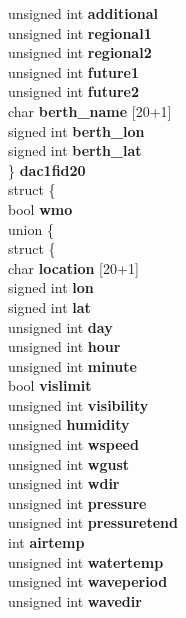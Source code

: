 \begin{DoxyCompactItemize}
{\begin{tabbing}
{\>\>\>\>unsigned int {\bfseries additional}\\
\>\>\>\>unsigned int {\bfseries regional1}\\
\>\>\>\>unsigned int {\bfseries regional2}\\
\>\>\>\>unsigned int {\bfseries future1}\\
\>\>\>\>unsigned int {\bfseries future2}\\
\>\>\>\>char {\bfseries berth\_name} \mbox{[}20+1\mbox{]}\\
\>\>\>\>signed int {\bfseries berth\_lon}\\
\>\>\>\>signed int {\bfseries berth\_lat}\\
\>\>\>\} {\bfseries dac1fid20}\\
\>\>\>struct \{\\
\>\>\>\>bool {\bfseries wmo}\\
\hypertarget{structais__t_1_1@34_1_1@39_1_1@59_1_1@67_ab274330a2157ecf053f7216534d525ae}{\>\>\>\>union \{\\
\>\>\>\>\>struct \{\\
\>\>\>\>\>\>char {\bfseries location} \mbox{[}20+1\mbox{]}\\
\>\>\>\>\>\>signed int {\bfseries lon}\\
\>\>\>\>\>\>signed int {\bfseries lat}\\
\>\>\>\>\>\>unsigned int {\bfseries day}\\
\>\>\>\>\>\>unsigned int {\bfseries hour}\\
\>\>\>\>\>\>unsigned int {\bfseries minute}\\
\>\>\>\>\>\>bool {\bfseries vislimit}\\
\>\>\>\>\>\>unsigned int {\bfseries visibility}\\
\>\>\>\>\>\>unsigned {\bfseries humidity}\\
\>\>\>\>\>\>unsigned int {\bfseries wspeed}\\
\>\>\>\>\>\>unsigned int {\bfseries wgust}\\
\>\>\>\>\>\>unsigned int {\bfseries wdir}\\
\>\>\>\>\>\>unsigned int {\bfseries pressure}\\
\>\>\>\>\>\>unsigned int {\bfseries pressuretend}\\
\>\>\>\>\>\>int {\bfseries airtemp}\\
\>\>\>\>\>\>unsigned int {\bfseries watertemp}\\
\>\>\>\>\>\>unsigned int {\bfseries waveperiod}\\
\>\>\>\>\>\>unsigned int {\bfseries wavedir}\\
}}
\end{tabbing}}
\end{DoxyCompactItemize}
